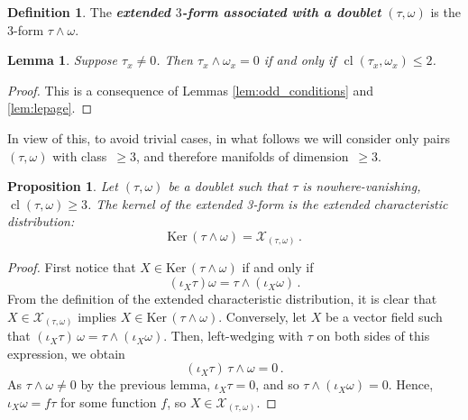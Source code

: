 \documentclass[11pt,twoside]{article}
\theoremstyle{plain}
\newtheorem{proposition}[theorem]{Proposition}
\newtheorem{lemma}[theorem]{Lemma}
\theoremstyle{definition}
\newtheorem{definition}[theorem]{Definition}
\newcommand*{\inn}[1]{\iota_{#1}}
\DeclareMathOperator{\cl}{cl}
\newcommand\dfn[1]{{\textbf{\emph{#1}}}}
\def\Ker{\mathrm{Ker \,}}
\begin{document}
\begin{definition}
The \dfn{extended $3$-form associated with a doublet} $(\tau,\omega)$ 
is the 3-form $\tau \wedge \omega$.
\end{definition}

\begin{lemma}
Suppose $\tau_x \neq 0$.
Then 
$\tau_x \wedge \omega_x = 0$ if and only if $\cl(\tau_x,\omega_x) \leq 2$.
\end{lemma}
\begin{proof}
This is a consequence of Lemmas \ref{lem:odd_conditions} and \ref{lem:lepage}.
\end{proof}


In view of this, to avoid trivial cases,
in what follows we will consider only pairs $(\tau,\omega)$
with class~$\geq 3$,
and therefore manifolds of dimension~$\geq 3$.

\begin{proposition}
\label{kernel_3-form_extended_characteristic}
Let $(\tau,\omega)$ be a doublet such that $\tau$ is nowhere-vanishing, 
$\cl (\tau,\omega)\geq 3$. 
The kernel of the extended 3-form is the extended characteristic distribution: 
$$ 
\Ker (\tau \wedge \omega) = \mathcal{X}_{(\tau,\omega)}\,.
$$
\end{proposition}
\begin{proof}
First notice that 
$X \in \Ker (\tau \wedge \omega)$ if and only if 
$$
(\inn{X} \tau) \omega = \tau\wedge (\inn{X} \omega)\,.
$$
From the definition of the extended characteristic distribution,
it is clear that 
$X\in \mathcal{X}_{(\tau,\omega)}$ implies 
$X\in \Ker {(\tau\wedge\omega)}$. 
Conversely, let $X$ be a vector field such that 
$(\inn{X} \tau) \,\omega = \tau\wedge (\inn{X} \omega)$. 
Then, left-wedging with $\tau$ on both sides of this expression, we obtain
$$
(\inn{X}\tau) \,\tau\wedge \omega =0\,.
$$
    As $\tau\wedge \omega \neq 0$ by the previous lemma, $\inn{X} \tau = 0$, and so
    $\tau\wedge (\inn{X} \omega)=0$. Hence, $\inn{X}\omega = f\tau$ for some function $f$, so $X \in \mathcal{X}_{(\tau,\omega)}$.
\end{proof}

\end{document}
